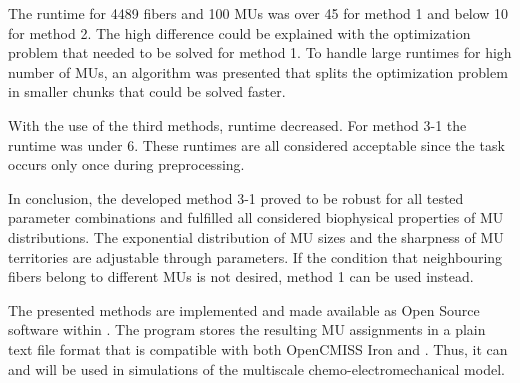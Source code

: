 The runtime for 4489 fibers and 100 MUs was over \SI{45}{\min} for method 1 and below \SI{10}{\sec} for method 2. The high difference could be explained with the optimization problem that needed to be solved for method 1. To handle large runtimes for high number of MUs, an algorithm was presented that splits the optimization problem in smaller chunks that could be solved faster.

With the use of the third methods, runtime decreased. For method 3-1 the runtime was under \SI{6}{\min}. These runtimes are all considered acceptable since the task occurs only once during preprocessing. 

In conclusion, the developed method 3-1 proved to be robust for all tested parameter combinations and fulfilled all considered biophysical properties of MU distributions. The exponential distribution of MU sizes and the sharpness of MU territories are adjustable through parameters. If the condition that neighbouring fibers belong to different MUs is not desired, method 1 can be used instead.

The presented methods are implemented and made available as Open Source software within \opendihu{}.
The program stores the resulting MU assignments in a plain text file format that is compatible with both OpenCMISS Iron and \opendihu{}. Thus, it can and will be used in simulations of the multiscale chemo-electromechanical model.
